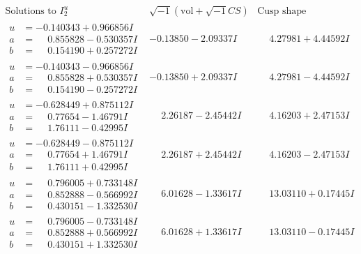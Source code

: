 \documentclass[1p]{elsarticle_modified}
\theoremstyle{definition}
\newcommand{\I}{\sqrt{-1}}
\begin{document}
$$\begin{array}{c|c|c}  
\text{Solutions to }I^u_{2}& \I (\text{vol} + \sqrt{-1}CS) & \text{Cusp shape}\\
 \hline 
\begin{aligned}
u &= -0.140343 + 0.966856 I \\
a &= \phantom{-}0.855828 - 0.530357 I \\
b &= \phantom{-}0.154190 + 0.257272 I\end{aligned}
 & -0.13850 - 2.09337 I & \phantom{-}4.27981 + 4.44592 I \\ \hline\begin{aligned}
u &= -0.140343 - 0.966856 I \\
a &= \phantom{-}0.855828 + 0.530357 I \\
b &= \phantom{-}0.154190 - 0.257272 I\end{aligned}
 & -0.13850 + 2.09337 I & \phantom{-}4.27981 - 4.44592 I \\ \hline\begin{aligned}
u &= -0.628449 + 0.875112 I \\
a &= \phantom{-}0.77654 - 1.46791 I \\
b &= \phantom{-}1.76111 - 0.42995 I\end{aligned}
 & \phantom{-}2.26187 - 2.45442 I & \phantom{-}4.16203 + 2.47153 I \\ \hline\begin{aligned}
u &= -0.628449 - 0.875112 I \\
a &= \phantom{-}0.77654 + 1.46791 I \\
b &= \phantom{-}1.76111 + 0.42995 I\end{aligned}
 & \phantom{-}2.26187 + 2.45442 I & \phantom{-}4.16203 - 2.47153 I \\ \hline\begin{aligned}
u &= \phantom{-}0.796005 + 0.733148 I \\
a &= \phantom{-}0.852888 - 0.566992 I \\
b &= \phantom{-}0.430151 - 1.332530 I\end{aligned}
 & \phantom{-}6.01628 - 1.33617 I & \phantom{-}13.03110 + 0.17445 I \\ \hline\begin{aligned}
u &= \phantom{-}0.796005 - 0.733148 I \\
a &= \phantom{-}0.852888 + 0.566992 I \\
b &= \phantom{-}0.430151 + 1.332530 I\end{aligned}
 & \phantom{-}6.01628 + 1.33617 I & \phantom{-}13.03110 - 0.17445 I \\ \hline\begin{aligned}

\end{aligned}
\end{array}$$
\end{document}
